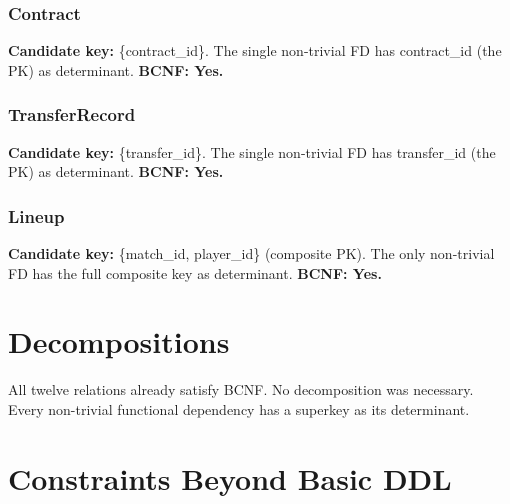 \documentclass[12pt]{article}
\begin{document}
\subsubsection{Contract}
\textbf{Candidate key:} \{contract\_id\}. The single non-trivial FD has contract\_id (the PK) as determinant. \textbf{BCNF: Yes.}

\subsubsection{TransferRecord}
\textbf{Candidate key:} \{transfer\_id\}. The single non-trivial FD has transfer\_id (the PK) as determinant. \textbf{BCNF: Yes.}

\subsubsection{Lineup}
\textbf{Candidate key:} \{match\_id, player\_id\} (composite PK). The only non-trivial FD has the full composite key as determinant. \textbf{BCNF: Yes.}

\section{Decompositions}
All twelve relations already satisfy BCNF. No decomposition was necessary. Every non-trivial functional dependency has a superkey as its determinant.

\section{Constraints Beyond Basic DDL}
\end{document}
